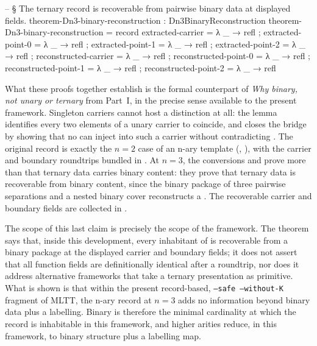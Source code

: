 \documentclass[11pt]{article}
\begin{document}
\begin{code}
    -- § The ternary record is recoverable from pairwise binary data at displayed fields.
theorem-Dn3-binary-reconstruction : Dn3BinaryReconstruction
theorem-Dn3-binary-reconstruction = record
  { extracted-carrier     = λ _ → refl
  ; extracted-point-0     = λ _ → refl
  ; extracted-point-1     = λ _ → refl
  ; extracted-point-2     = λ _ → refl
  ; reconstructed-carrier = λ _ → refl
  ; reconstructed-point-0 = λ _ → refl
  ; reconstructed-point-1 = λ _ → refl
  ; reconstructed-point-2 = λ _ → refl
  }
\end{code}

What these proofs together establish is the formal counterpart of
\emph{Why binary, not unary or ternary} from Part~I, in the precise
sense available to the present framework.  Singleton carriers cannot
host a distinction at all: the lemma
 identifies every two elements of
a unary carrier to coincide, and 
closes the bridge by showing that no  can
inject into such a carrier without contradicting
.  The original record is exactly the $n=2$
case of an n-ary template (,
), with the carrier and boundary
roundtrips bundled in
.  At $n=3$, the conversions
 and  prove
more than that ternary data carries binary content: they prove that
ternary data is recoverable from binary content, since the binary
package of three pairwise separations and a nested binary cover
reconstructs a  .  The
recoverable carrier and boundary fields are collected in
.

The scope of this last claim is precisely the scope of the framework.
The theorem says that, inside this development, every inhabitant of
  is recoverable from a binary
package at the displayed carrier and boundary fields; it does not
assert that all function fields are definitionally identical after a
roundtrip, nor does it address alternative frameworks that take a
ternary presentation as primitive.  What is shown is that within the
present record-based, \texttt{--safe --without-K} fragment of MLTT, the
n-ary record at $n=3$ adds no information beyond binary data plus a
labelling.  Binary is therefore the minimal cardinality at which the
 record is inhabitable in this framework, and
higher arities reduce, in this framework, to binary structure plus a
labelling map.
\end{document}
